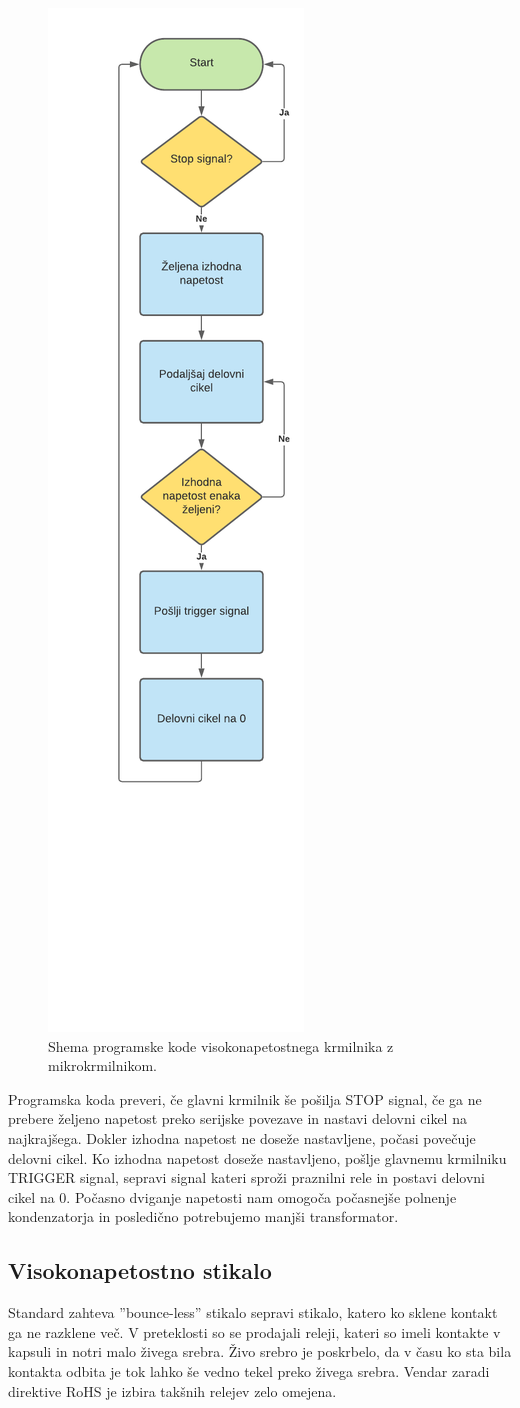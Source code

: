\documentclass[a4paper,twoside,openright,12pt,slovene]{book}
\begin{document}
	\begin{figure}[H]
    \centering
    \includegraphics[width=0.35\columnwidth]{Sheme/KrmilnikzuCShema.pdf}
    \caption{\label{KrmilnikzuCShema} Shema programske kode visokonapetostnega krmilnika z mikrokrmilnikom.}
	\end{figure}
	
Programska koda preveri, če glavni krmilnik še pošilja STOP signal, če ga ne prebere željeno napetost preko serijske povezave in nastavi delovni cikel na najkrajšega. Dokler izhodna napetost ne doseže nastavljene, počasi povečuje delovni cikel. Ko izhodna napetost doseže nastavljeno, pošlje glavnemu krmilniku TRIGGER signal, sepravi signal kateri sproži praznilni rele in postavi delovni cikel na 0. Počasno dviganje napetosti nam omogoča počasnejše polnenje kondenzatorja in posledično potrebujemo manjši transformator.

	\subsection{Visokonapetostno stikalo} \label{Visokonapetostno stikalo}
	Standard zahteva ''bounce-less'' stikalo sepravi stikalo, katero ko sklene kontakt ga ne razklene več. V preteklosti so se prodajali releji, kateri so imeli kontakte v kapsuli in notri malo živega srebra. Živo srebro je poskrbelo, da v času ko sta bila kontakta odbita je tok lahko še vedno tekel preko živega srebra. Vendar zaradi direktive RoHS je izbira takšnih relejev zelo omejena.
	
\end{document}
